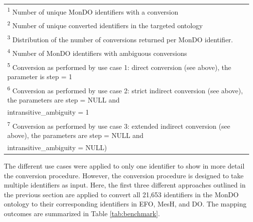 \documentclass[9pt,a4paper,]{extarticle}
\begin{document}
\begin{table}
{\begin{tabular}[t]{lrrrrrr}
\bottomrule
\multicolumn{7}{l}{\textsuperscript{1} Number of unique MonDO identifiers with a conversion}\\
\multicolumn{7}{l}{\textsuperscript{2} Number of unique converted identifiers in the targeted ontology}\\
\multicolumn{7}{l}{\textsuperscript{3} Distribution of the number of conversions returned per MonDO identifier.}\\
\multicolumn{7}{l}{\textsuperscript{4} Number of MonDO identifiers with ambiguous conversions}\\
\multicolumn{7}{l}{\textsuperscript{5} Conversion as performed by use case 1: direct conversion (see above), the parameter is step = 1}\\
\multicolumn{7}{l}{\textsuperscript{6} Conversion as performed by use case 2: strict indirect conversion (see above), the parameters are step = NULL and}\\
\multicolumn{7}{l}{intransitive\_ambiguity = 1}\\
\multicolumn{7}{l}{\textsuperscript{7} Conversion as performed by use case 3: extended indirect conversion (see above), the parameters are step = NULL and}\\
\multicolumn{7}{l}{intransitive\_ambiguity = NULL)}\\
\end{tabular}}
\end{table}

The different use cases were applied to only one identifier to show in more detail the conversion procedure. However, the conversion procedure is designed to take multiple identifiers as input. Here, the first three different approaches outlined in the previous section are applied to convert all 21,653 identifiers in the MonDO ontology to their corresponding identifiers in EFO, MesH, and DO. The mapping outcomes are summarized in Table \ref{tab:benchmark}.
\end{document}
